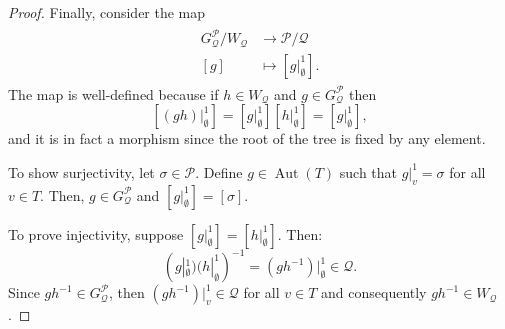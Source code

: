 \documentclass[10pt,a4paper]{amsart}
\DeclareMathOperator{\Aut}{Aut}
\begin{document}
\begin{proof}
Finally, consider the map 
\begin{align}
\begin{split}
G_\mathcal{Q}^\mathcal{P}/W_\mathcal{Q} & \rightarrow \mathcal{P}/\mathcal{Q} \\ 
[g] & \mapsto [g|_\emptyset^1].
\label{equation: cosets of GQP}
\end{split}
\end{align}
The map is well-defined because if $h \in W_\mathcal{Q}$ and $g \in G_\mathcal{Q}^\mathcal{P}$ then $$[(gh)|_\emptyset^1] = [g|_\emptyset^1] [h|_\emptyset^1] = [g|_\emptyset^1],$$ and it is in fact a morphism since the root of the tree is fixed by any element. 

To show surjectivity, let $\sigma \in \mathcal{P}$.  Define $g \in \Aut(T)$ such that $g|_v^1 = \sigma$ for all $v \in T$. Then, $g \in G_\mathcal{Q}^\mathcal{P}$ and $[g|_\emptyset^1] = [\sigma]$. 

To prove injectivity, suppose $[g|_\emptyset^1] = [h|_\emptyset^1]$. Then: $$(g|_\emptyset^1)(h|_\emptyset^1)^{-1} = (gh^{-1})|_\emptyset^1 \in \mathcal{Q}.$$ Since $gh^{-1} \in G_\mathcal{Q}^\mathcal{P}$, then $(gh^{-1})|_v^1 \in \mathcal{Q}$ for all $v \in T$ and consequently $gh^{-1} \in W_\mathcal{Q}$. 
\end{proof}
\end{document}
